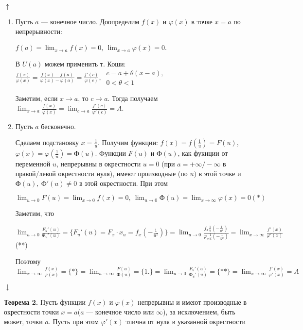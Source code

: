 \documentclass{article}
\begin{document}
    \(\uparrow\)
    \begin{enumerate}
        \item Пусть \(a\) --- конечное число. Доопределим \(f(x)\) и \(\varphi(x)\) в точке \(x=a\) по непрерывности:

        \(f(a) = \lim_{x \to a} f(x) = 0,\ \lim_{x \to a} \varphi(x) = 0\).

        В \(U(a)\) можем применить т. Коши: \(\frac{f(x)}{\varphi(x)} = \frac{f(x) - f(a)}{\varphi(x) - \varphi(a)} = \frac{f'(c)}{\varphi(c)},\ \begin{array}{l} c = a + \theta(x-a),\\ 0 < \theta < 1\end{array}\)

        Заметим, если \(x \to a\), то \(c \to a\). Тогда получаем \(\lim_{x \to a} \frac{f(x)}{\varphi(x)} = \lim_{c \to a} \frac{f'(c)}{\varphi'(c)} = A\).
        
        \item Пусть $a$ бесконечно.
        
        Сделаем подстановку \( x = \frac{1}{u} \). Получим функции: \( f(x) = f(\frac{1}{u}) = F(u) \), \( \varphi(x) = \varphi(\frac{1}{u}) = \textrm{Ф}(u) \). Функции \( F(u) \) и \( \textrm{Ф}(u) \), как фукнции от переменной $u$, непрерывны в окрестности $u = 0$ (при $a = +\infty/-\infty$ в правой/левой окрестности нуля), имеют производные (по $u$) в этой точке и \( \textrm{Ф}(u),\ \textrm{Ф}'(u) \neq 0 \) в этой окрестности. При этом

        \( \lim_{u \to 0}F(u) = \lim_{x \to 0}f(x) = 0,\ \lim_{u \to 0}\textrm{Ф}(u) = \lim_{x \to \infty}\varphi(x) = 0 (*) \) 
        
        Заметим, что 

        \(\lim_{u \to 0} \frac{F_u'(u)}{\Phi_u'(u)} = \{F_u'(u) = F_x \cdot x_u = f_x(-\frac{1}{u^2})\} = \lim_{u \to 0} \frac{f_x\frac{1}{u}(-\frac{1}{u^2})}{\varphi_x\frac{1}{u}(-\frac{1}{u^2})} = \lim_{x \to \infty} \frac{f'(x)}{\varphi'(x)}\)(**)
    
        Поэтому \( \lim_{x \to \infty}\frac{f(x)}{\varphi(x)} = \{*\} = \lim_{u \to \infty}\frac{F(u)}{\textrm{Ф}(u)} = \{1.\} = \lim_{u \to 0}\frac{F_u'(u)}{\textrm{Ф}_u'(u)} = \{**\} = \lim_{x \to \infty}\frac{f'(x)}{\varphi'(x)} = A \)
    \end{enumerate}
    \(\downarrow\)

    \textbf{Теорема 2.} Пусть функции \(f(x)\) и \(\varphi(x)\) непрерывны и имеют производные в окрестности точки \(x=a\)(\(a\) --- конечное число или \(\infty\)), за исключением, быть может, точки \(a\). Пусть при этом \(\varphi'(x)\) тлична от нуля в указанной окрестности
\end{document}
